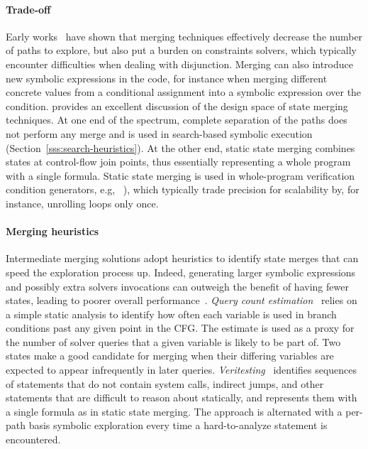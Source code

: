 \paragraph{Trade-off} Early works~\cite{G-POPL07,HSS-RV09} have shown that merging techniques effectively decrease the number of paths to explore, but also put a burden on constraints solvers, which typically encounter difficulties when dealing with disjunction. Merging can also introduce new symbolic expressions in the code, for instance when merging different concrete values from a conditional assignment into a symbolic expression over the condition. \cite{KKB-PLDI12} provides an excellent discussion of the design space of state merging techniques. At one end of the spectrum, complete separation of the paths does not perform any merge and is used in search-based symbolic execution (Section~\ref{sss:search-heuristics}). At the other end, static state merging combines states at control-flow join points, thus essentially representing a whole program with a single formula. Static state merging is used in whole-program verification condition generators, e.g, ~\cite{SATURN-POPL05,CALYSTO-ICSE08}), which typically trade precision for scalability by, for instance, unrolling loops only once.



\paragraph{Merging heuristics} Intermediate merging solutions adopt heuristics to identify state merges that can speed the exploration process up. Indeed, generating larger symbolic expressions and possibly extra solvers invocations can outweigh the benefit of having fewer states, leading to poorer overall performance~\cite{HSS-RV09,KKB-PLDI12}. {\em Query count estimation}~\cite{KKB-PLDI12} relies on a simple static analysis to identify how often each variable is used in branch conditions past any given point in the CFG. The estimate is used as a proxy for the number of solver queries that a given variable is likely to be part of. Two states make a good candidate for merging when their differing variables are expected to appear infrequently in later queries. {\em Veritesting}~\cite{VERITESTING-ICSE14} identifies sequences of statements that do not contain system calls, indirect jumps, and other statements that are difficult to reason about statically, and represents them with a single formula as in static state merging. The approach is alternated with a per-path basis symbolic exploration every time a hard-to-analyze statement is encountered. 

